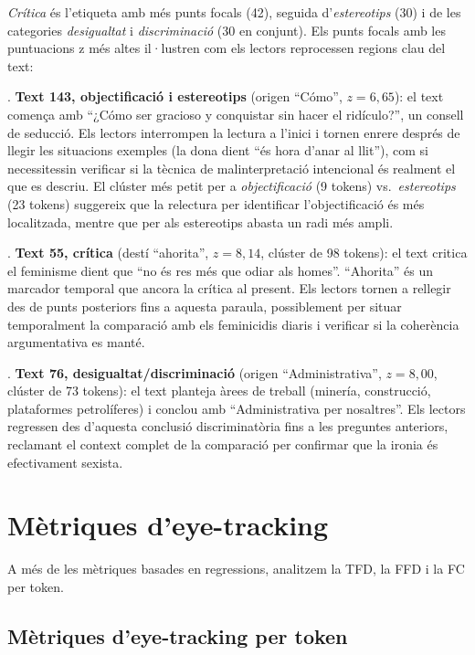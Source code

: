 \textit{Crítica} és l'etiqueta amb més punts focals (42), seguida d'\textit{estereotips} (30) i de les categories \textit{desigualtat} i \textit{discriminació} (30 en conjunt).
Els punts focals amb les puntuacions z més altes il·lustren com els lectors reprocessen regions clau del text:

\ex. \label{ex:hotspot143} \textbf{Text 143, objectificació i estereotips} (origen ``Cómo'', $z = 6{,}65$): el text comença amb ``¿Cómo ser gracioso y conquistar sin hacer el ridículo?'', un consell de seducció. Els lectors interrompen la lectura a l'inici i tornen enrere després de llegir les situacions exemples (la dona dient ``és hora d'anar al llit''), com si necessitessin verificar si la tècnica de malinterpretació intencional és realment el que es descriu. El clúster més petit per a \textit{objectificació} (9 tokens) vs.\ \textit{estereotips} (23 tokens) suggereix que la relectura per identificar l'objectificació és més localitzada, mentre que per als estereotips abasta un radi més ampli.

\ex. \label{ex:hotspot55} \textbf{Text 55, crítica} (destí ``ahorita'', $z = 8{,}14$, clúster de 98 tokens): el text critica el feminisme dient que ``no és res més que odiar als homes''. ``Ahorita'' és un marcador temporal que ancora la crítica al present. Els lectors tornen a rellegir des de punts posteriors fins a aquesta paraula, possiblement per situar temporalment la comparació amb els feminicidis diaris i verificar si la coherència argumentativa es manté.

\ex. \label{ex:hotspot76} \textbf{Text 76, desigualtat/discriminació} (origen ``Administrativa'', $z = 8{,}00$, clúster de 73 tokens): el text planteja àrees de treball (minería, construcció, plataformes petrolíferes) i conclou amb ``Administrativa per nosaltres''. Els lectors regressen des d'aquesta conclusió discriminatòria fins a les preguntes anteriors, reclamant el context complet de la comparació per confirmar que la ironia és efectivament sexista.

\section{Mètriques d'eye-tracking}

A més de les mètriques basades en regressions, analitzem la TFD, la FFD i la FC per token.

\subsection{Mètriques d'eye-tracking per token}

